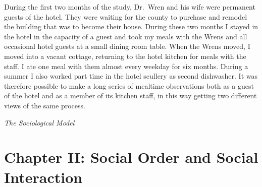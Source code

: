 \documentclass[openany,nobib]{tufte-book}
\let\oldchapter\chapter
\def\chapter{%
  \setcounter{footnote}{0}%
  \oldchapter
}
\begin{document}
During the first two months of the study, Dr.~Wren and his wife were
permanent guests of the hotel. They were waiting for the county to
purchase and remodel the building that was to become their house. During
these two months I stayed in the hotel in the capacity of a guest and
took my meals with the Wrens and all occasional hotel guests at a small
dining room table. When the Wrens moved, I moved into a vacant cottage,
returning to the hotel kitchen for meals with the staff. I ate one meal
with them almost every weekday for six months. During a summer I also
worked part time in the hotel scullery as second dishwasher. It was
therefore possible to make a long series of mealtime observations both
as a guest of the hotel and as a member of its kitchen staff, in this
way getting two different views of the same process.


\newpage
\thispagestyle{empty}
\begin{fullwidth}

\begin{center}
\vspace*{3in}

{\fontsize{35}{24}\selectfont{Part Two}\par}

\vspace{1in}

{\fontsize{35}{24}\selectfont\textit{The Sociological Model}\par}

\end{center}

\end{fullwidth}

\chapter[CHAPTER II: SOCIAL ORDER AND SOCIAL INTERACTION]{Chapter II: Social Order and Social Interaction}
\label{ch:Chapter II: Social Order and Social Interaction}
\end{document}
